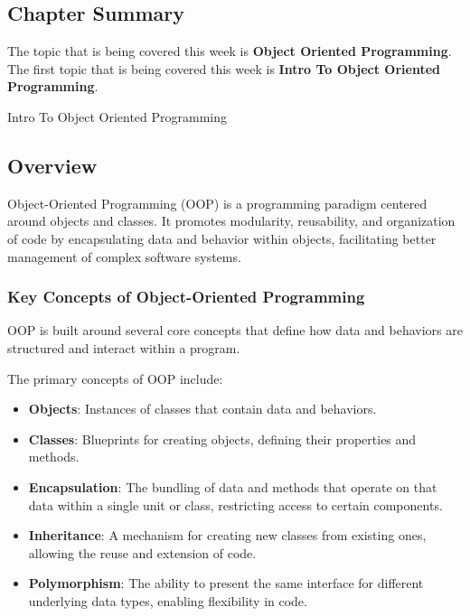 \subsection{Chapter Summary}

The topic that is being covered this week is \textbf{Object Oriented Programming}. The first topic that is being covered this week is \textbf{Intro To Object Oriented Programming}.

\begin{notes}{Intro To Object Oriented Programming}
    \subsection*{Overview}

    Object-Oriented Programming (OOP) is a programming paradigm centered around objects and classes. It promotes modularity, reusability, and organization of code by encapsulating data and behavior within objects, facilitating better management of complex software systems.
    
    \subsubsection*{Key Concepts of Object-Oriented Programming}
    
    OOP is built around several core concepts that define how data and behaviors are structured and interact within a program.
    
    \begin{highlight}
    
        The primary concepts of OOP include:
    
        \begin{itemize}
            \item \textbf{Objects}: Instances of classes that contain data and behaviors.
            \item \textbf{Classes}: Blueprints for creating objects, defining their properties and methods.
            \item \textbf{Encapsulation}: The bundling of data and methods that operate on that data within a single unit or class, restricting access to certain components.
            \item \textbf{Inheritance}: A mechanism for creating new classes from existing ones, allowing the reuse and extension of code.
            \item \textbf{Polymorphism}: The ability to present the same interface for different underlying data types, enabling flexibility in code.
        \end{itemize}
    

\end{highlight}
\end{notes}
